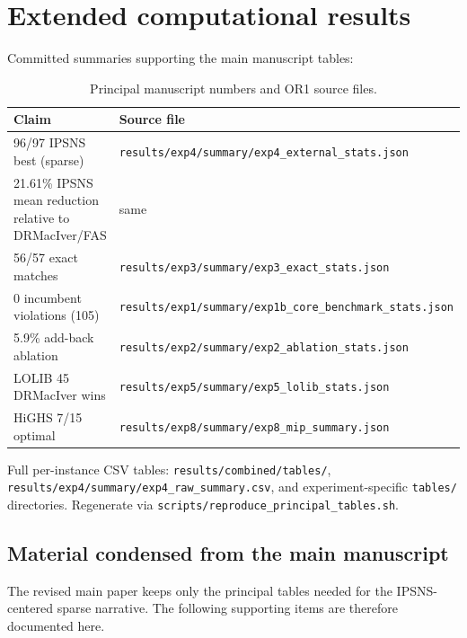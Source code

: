 \section{Extended computational results}
\label{sec:or1-extended}

Committed summaries supporting the main manuscript tables:

\begin{table}[h]
\centering\small
\caption{Principal manuscript numbers and OR1 source files.}
\begin{tabular}{ll}
\toprule
Claim & Source file \\
\midrule
96/97 IPSNS best (sparse) & \texttt{results/exp4/summary/exp4\_external\_stats.json} \\
21.61\% IPSNS mean reduction relative to DRMacIver/FAS & same \\
56/57 exact matches & \texttt{results/exp3/summary/exp3\_exact\_stats.json} \\
0 incumbent violations (105) & \texttt{results/exp1/summary/exp1b\_core\_benchmark\_stats.json} \\
5.9\% add-back ablation & \texttt{results/exp2/summary/exp2\_ablation\_stats.json} \\
LOLIB 45 DRMacIver wins & \texttt{results/exp5/summary/exp5\_lolib\_stats.json} \\
HiGHS 7/15 optimal & \texttt{results/exp8/summary/exp8\_mip\_summary.json} \\
\bottomrule
\end{tabular}
\end{table}

Full per-instance CSV tables: \texttt{results/combined/tables/}, \texttt{results/exp4/summary/exp4\_raw\_summary.csv}, and experiment-specific \texttt{tables/} directories. Regenerate via \texttt{scripts/reproduce\_principal\_tables.sh}.

\subsection{Material condensed from the main manuscript}

The revised main paper keeps only the principal tables needed for the IPSNS-centered sparse narrative. The following supporting items are therefore documented here.

